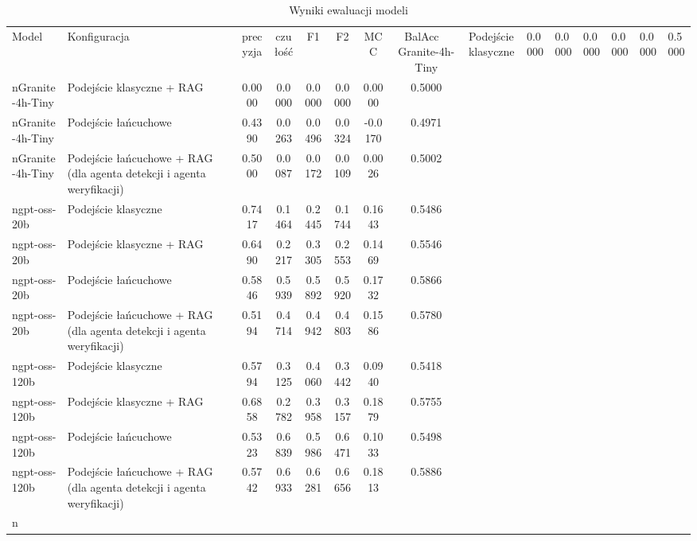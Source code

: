 \begin{table}[htbp]
\centering
\caption{Wyniki ewaluacji modeli}
\label{tab:wyniki}
\begin{tabular}{llcccccc}
\toprule
Model & Konfiguracja & precyzja & czułość & F1 & F2 & MCC & BalAcc \
\midrule
Granite-4h-Tiny & Podejście klasyczne & 0.0000 & 0.0000 & 0.0000 & 0.0000 & 0.0000 & 0.5000 \\nGranite-4h-Tiny & Podejście klasyczne + RAG & 0.0000 & 0.0000 & 0.0000 & 0.0000 & 0.0000 & 0.5000 \\nGranite-4h-Tiny & Podejście łańcuchowe & 0.4390 & 0.0263 & 0.0496 & 0.0324 & -0.0170 & 0.4971 \\nGranite-4h-Tiny & Podejście łańcuchowe + RAG (dla agenta detekcji i agenta weryfikacji) & 0.5000 & 0.0087 & 0.0172 & 0.0109 & 0.0026 & 0.5002 \\ngpt-oss-20b & Podejście klasyczne & 0.7417 & 0.1464 & 0.2445 & 0.1744 & 0.1643 & 0.5486 \\ngpt-oss-20b & Podejście klasyczne + RAG & 0.6490 & 0.2217 & 0.3305 & 0.2553 & 0.1469 & 0.5546 \\ngpt-oss-20b & Podejście łańcuchowe & 0.5846 & 0.5939 & 0.5892 & 0.5920 & 0.1732 & 0.5866 \\ngpt-oss-20b & Podejście łańcuchowe + RAG (dla agenta detekcji i agenta weryfikacji) & 0.5194 & 0.4714 & 0.4942 & 0.4803 & 0.1586 & 0.5780 \\ngpt-oss-120b & Podejście klasyczne & 0.5794 & 0.3125 & 0.4060 & 0.3442 & 0.0940 & 0.5418 \\ngpt-oss-120b & Podejście klasyczne + RAG & 0.6858 & 0.2782 & 0.3958 & 0.3157 & 0.1879 & 0.5755 \\ngpt-oss-120b & Podejście łańcuchowe & 0.5323 & 0.6839 & 0.5986 & 0.6471 & 0.1033 & 0.5498 \\ngpt-oss-120b & Podejście łańcuchowe + RAG (dla agenta detekcji i agenta weryfikacji) & 0.5742 & 0.6933 & 0.6281 & 0.6656 & 0.1813 & 0.5886 \\n\bottomrule
\end{tabular}
\end{table}
